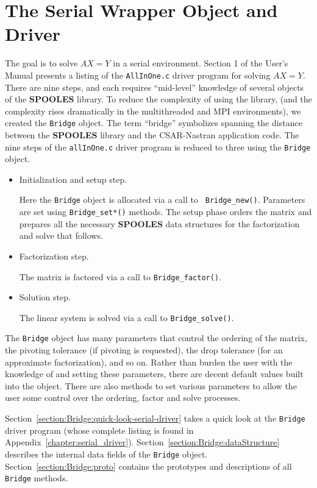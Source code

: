\chapter{The Serial Wrapper Object and Driver}
\label{section:serial}
\par
The goal is to solve $AX = Y$ in a serial environment.
Section 1 of the User's Manual presents a listing of the 
{\tt AllInOne.c} driver program for solving $AX =Y$.
There are nine steps, and each requires ``mid-level'' knowledge 
of several objects of the {\bf SPOOLES} library.
To reduce the complexity of using the library, 
(and the complexity rises dramatically in the multithreaded and MPI
environments),
we created the {\tt Bridge} object.
The term ``bridge'' symbolizes spanning the distance between the
{\bf SPOOLES} library and the CSAR-Nastran application code.
The nine steps of the {\tt allInOne.c} driver program is reduced to
three using the {\tt Bridge} object.
\begin{itemize}
\item Initialization and setup step.
\par
Here the {\tt Bridge} object is allocated via a call to {\tt
Bridge\_new()}.
Parameters are set using {\tt Bridge\_set*()} methods.
The setup phase orders the matrix and prepares all the necessary {\bf
SPOOLES} data structures for the factorization and solve that follows.
\item Factorization step.
\par
The matrix is factored via a call to {\tt Bridge\_factor()}.
\item Solution step.
\par
The linear system is solved via a call to {\tt Bridge\_solve()}.
\end{itemize}
\par
The {\tt Bridge} object 
has many parameters that control the ordering of the matrix,
the pivoting tolerance (if pivoting is requested),
the drop tolerance (for an approximate factorization),
and so on.
Rather than burden the user with the knowledge of and setting these
parameters, there are decent default values built into the object.
There are also methods to set various parameters to allow the user
some control over the ordering, factor and solve processes.
\par
Section~\ref{section:Bridge:quick-look-serial-driver} takes a quick
look at the {\tt Bridge} driver program (whose complete listing is
found in Appendix~\ref{chapter:serial_driver}).
Section~\ref{section:Bridge:dataStructure} describes the internal 
data fields of the {\tt Bridge} object.
Section~\ref{section:Bridge:proto} contains the prototypes and
descriptions of all {\tt Bridge} methods.
\par
